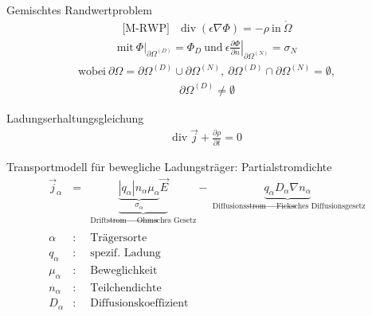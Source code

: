 \documentclass[a6paper]{kartei}
\renewcommand{\div}{\mathrm{div}\;}
\begin{document}
\begin{karte}{Gemischtes Randwertproblem}
\begin{eqnarray*}
  \text{[M-RWP]} \quad \div(\epsilon \nabla \Phi) = - \rho \ \text{in} \ \mathring{\Omega} \nonumber
\end{eqnarray*}
\begin{eqnarray*}
\text{mit} \ \Phi|_{\partial \Omega^{(D)}} = \Phi_{D} \ \text{und} \ \epsilon \left. \frac{\partial \Phi}{\partial n} \right|_{\partial \Omega^{(N)}} = \sigma_{N} \nonumber
\end{eqnarray*}
\begin{eqnarray*}
\text{wobei} \ \partial \Omega = \partial \Omega^{(D)} \cup \partial \Omega^{(N)}, \ \partial \Omega^{(D)} \cap \partial \Omega^{(N)} = \emptyset, \nonumber
\end{eqnarray*}
\begin{eqnarray*}
\partial \Omega^{(D)} \neq \emptyset
\end{eqnarray*}
\end{karte}


\begin{karte}{Ladungserhaltungsgleichung}
\begin{eqnarray*}
 \div \vec{j} + \frac{\partial \rho}{\partial t} = 0
\end{eqnarray*}
\end{karte}

\begin{karte}{Transportmodell für bewegliche Ladungsträger: Partialstromdichte}
 \begin{eqnarray*}
  \vec{j}_{\alpha} & = & \underbrace{\underbrace{|q_{\alpha}| n_{\alpha} \mu_{\alpha}}_{\sigma_{\alpha}} \vec{E}}_{\text{Driftstrom $\rightarrow$
Ohmsches Gesetz}} - \underbrace{q_{\alpha} D_{\alpha} \nabla n_{\alpha}}_{\text{ Diffusionsstrom $\rightarrow$
Ficksches Diffusionsgesetz}} \\
 \nonumber \\
  \alpha & : &  \text{Trägersorte} \nonumber \\
  q_{\alpha} & : &   \text{spezif. Ladung} \nonumber \\
 \mu_{\alpha} & : &  \text{Beweglichkeit} \nonumber \\
 n_{\alpha} & : &  \text{Teilchendichte} \nonumber \\
 D_{\alpha} & : &  \text{Diffusionskoeffizient} \nonumber
\end{eqnarray*}
\end{karte}
\end{document}
